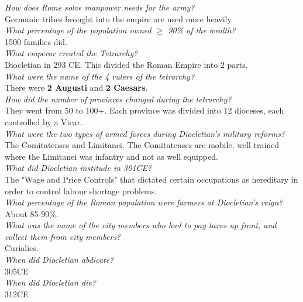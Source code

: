 \documentclass[12pt]{article}
\begin{document}
\textit{How does Rome solve manpower needs for the army?}\\
Germanic tribes brought into the empire are used more heavily.\\

\textit{What percentage of the population owned $\geq$ 90\% of the wealth?}\\
1500 families did.\\

\textit{What emperor created the Tetrarchy?}\\
Diocletian in 293 CE. This divided the Roman Empire into 2 parts.\\

\textit{What were the name of the 4 rulers of the tetrarchy?}\\
There were \textbf{2 Augusti} and \textbf{2 Caesars}.\\

\textit{How did the number of provinces changed during the tetrarchy?}\\
They went from 50 to 100+. Each province was divided into 12 dioceses, each controlled by a Vicar.\\

\textit{What were the two types of armed forces during Diocletian's military reforms?}\\
The Comitatenses and Limitanei. The Comitatenses are mobile, well trained where the Limitanei was infantry and not as well equipped.\\

\textit{What did Diocletian institude in 301CE?}\\
The "Wage and Price Controls" that dictated certain occupations as hereditary in order to control labour shortage problems.\\

\textit{What percentage of the Roman population were farmers at Diocletian's reign?}\\
About 85-90\%.\\

\textit{What was the name of the city members who had to pay taxes up front, and collect them from city members?}\\
Curialies.\\

\textit{When did Diocletian abdicate?}\\
305CE\\

\textit{When did Diocletian die?}\\
312CE\\
\end{document}
